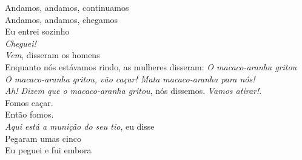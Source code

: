 \begin{linenumbers}\begingroup\raggedright
 
\noindent   Andamos, andamos, continuamos\\
  Andamos, andamos, chegamos\\
  Eu entrei sozinho\\
  \textit{Cheguei!}\\
  \textit{Vem}, disseram os homens\\
  Enquanto nós estávamos rindo, as mulheres disseram: \textit{O macaco-aranha gritou}\\
  \textit{O macaco-aranha gritou, vão caçar! Mata macaco-aranha para nós!}\\
  \textit{Ah! Dizem que o macaco-aranha gritou}, nós dissemos. \textit{Vamos atirar!}.\\
  Fomos caçar.\\
  Então fomos.\\
  \textit{Aqui está a munição do seu tio}, eu disse\\
  Pegaram umas cinco\\
  Eu peguei e fui embora

\end{linenumbers}\endgroup

\bigskip

